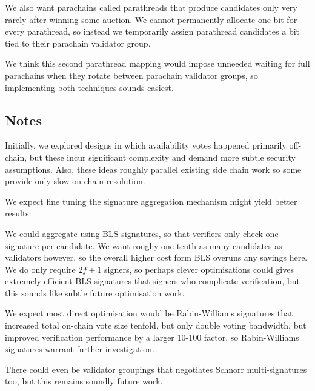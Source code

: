 We also want parachains called parathreads that produce candidates only very rarely after winning some auction.  We cannot permanently allocate one bit for every parathread, so instead we temporarily assign parathread candidates a bit tied to their parachain validator group.  

We think this second parathread mapping would impose unneeded waiting for full parachains when they rotate between parachain validator groups, so implementing both techniques sounds easiest. 


\subsection{Notes}

Initially, we explored designs in which availability votes happened primarily off-chain, but these incur significant complexity and demand more subtle security assumptions.  Also, these ideas roughly parallel existing side chain work so some provide only slow on-chain resolution.  

We expect fine tuning the signature aggregation mechanism might yield better results:

We could aggregate using BLS signatures, so that verifiers only check one signature per candidate.  We want roughy one tenth as many candidates as validators however, so the overall higher cost form BLS overuns any savings here.  We do only require $2f+1$ signers, so perhaps clever optimisations could gives extremely efficient BLS signatures that signers who complicate verification, but this sounds like subtle future optimisation work. 

We expect most direct optimisation would be Rabin-Williams signatures that increased total on-chain vote size tenfold, but only double voting bandwidth, but improved verification performance by a larger 10-100 factor, so Rabin-Williams signatures warrant further investigation.

There could even be validator groupings that negotiates Schnorr multi-signatures too, but this remains soundly future work.


